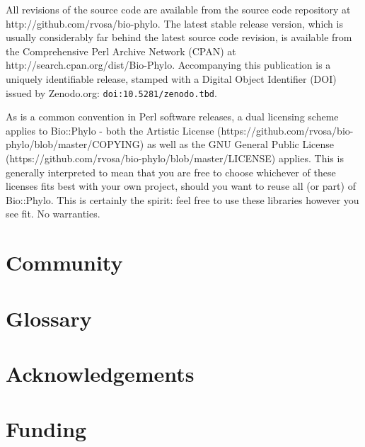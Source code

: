 \documentclass{bioinfo}
\begin{document}
All revisions of the source code are available from the source code repository at
http://github.com/rvosa/bio-phylo. The latest stable release version, which is usually 
considerably far behind the latest source code revision, is available from the 
Comprehensive Perl Archive Network (CPAN) at http://search.cpan.org/dist/Bio-Phylo. 
Accompanying this publication is a uniquely identifiable release, stamped with a Digital 
Object Identifier (DOI) issued by Zenodo.org: \texttt{doi:10.5281/zenodo.tbd}.

As is a common convention in Perl software releases, a dual licensing scheme applies to
Bio::Phylo - both the Artistic License 
(https://github.com/rvosa/bio-phylo/blob/master/COPYING) as well as the GNU General Public 
License (https://github.com/rvosa/bio-phylo/blob/master/LICENSE) applies. This is 
generally interpreted to mean that you are free to choose whichever of these licenses fits 
best with your own project, should you want to reuse all (or part) of Bio::Phylo. This is 
certainly the spirit: feel free to use these libraries however you see fit. No warranties.

\section{Community}

\section{Glossary}

\section*{Acknowledgements}

\section*{Funding}


%
%
%
%
%
%
%

\end{document}
